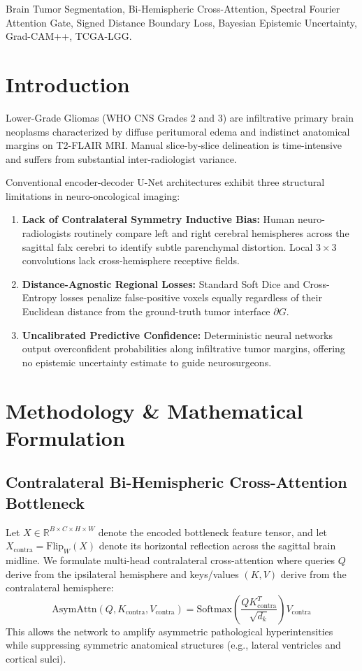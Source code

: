 \documentclass[conference]{IEEEtran}
\begin{document}
\begin{IEEEkeywords}
Brain Tumor Segmentation, Bi-Hemispheric Cross-Attention, Spectral Fourier Attention Gate, Signed Distance Boundary Loss, Bayesian Epistemic Uncertainty, Grad-CAM++, TCGA-LGG.
\end{IEEEkeywords}

\section{Introduction}
Lower-Grade Gliomas (WHO CNS Grades 2 and 3) are infiltrative primary brain neoplasms characterized by diffuse peritumoral edema and indistinct anatomical margins on T2-FLAIR MRI. Manual slice-by-slice delineation is time-intensive and suffers from substantial inter-radiologist variance.

Conventional encoder-decoder U-Net architectures exhibit three structural limitations in neuro-oncological imaging:
\begin{enumerate}
    \item \textbf{Lack of Contralateral Symmetry Inductive Bias:} Human neuro-radiologists routinely compare left and right cerebral hemispheres across the sagittal falx cerebri to identify subtle parenchymal distortion. Local $3\times 3$ convolutions lack cross-hemisphere receptive fields.
    \item \textbf{Distance-Agnostic Regional Losses:} Standard Soft Dice and Cross-Entropy losses penalize false-positive voxels equally regardless of their Euclidean distance from the ground-truth tumor interface $\partial G$.
    \item \textbf{Uncalibrated Predictive Confidence:} Deterministic neural networks output overconfident probabilities along infiltrative tumor margins, offering no epistemic uncertainty estimate to guide neurosurgeons.
\end{enumerate}

\section{Methodology \& Mathematical Formulation}

\subsection{Contralateral Bi-Hemispheric Cross-Attention Bottleneck}
Let $X \in \mathbb{R}^{B \times C \times H \times W}$ denote the encoded bottleneck feature tensor, and let $X_{\text{contra}} = \text{Flip}_W(X)$ denote its horizontal reflection across the sagittal brain midline. We formulate multi-head contralateral cross-attention where queries $Q$ derive from the ipsilateral hemisphere and keys/values $(K, V)$ derive from the contralateral hemisphere:
\begin{equation}
\text{AsymAttn}(Q, K_{\text{contra}}, V_{\text{contra}}) = \text{Softmax}\!\left(\frac{Q K_{\text{contra}}^T}{\sqrt{d_k}}\right) V_{\text{contra}}
\end{equation}
This allows the network to amplify asymmetric pathological hyperintensities while suppressing symmetric anatomical structures (e.g., lateral ventricles and cortical sulci).
\end{document}
